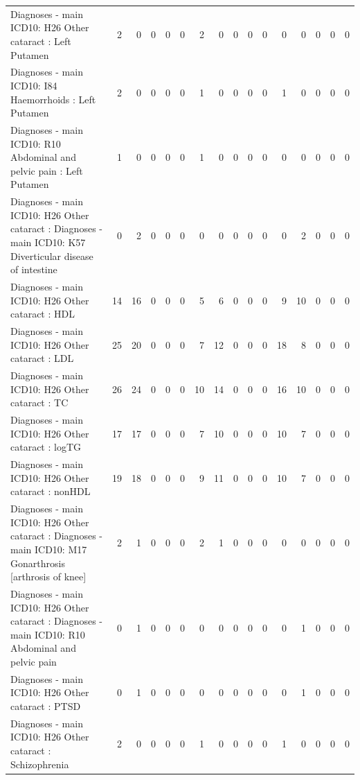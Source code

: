 \begin{table}[ht]
\begin{tabular}{lrrrrrrrrrrrrrrr}
  Diagnoses - main ICD10: H26 Other cataract : Left Putamen &   2 &   0 &   0 &   0 &   0 &   2 &   0 &   0 &   0 &   0 &   0 &   0 &   0 &   0 &   0 \\ 
  Diagnoses - main ICD10: I84 Haemorrhoids : Left Putamen &   2 &   0 &   0 &   0 &   0 &   1 &   0 &   0 &   0 &   0 &   1 &   0 &   0 &   0 &   0 \\ 
  Diagnoses - main ICD10: R10 Abdominal and pelvic pain : Left Putamen &   1 &   0 &   0 &   0 &   0 &   1 &   0 &   0 &   0 &   0 &   0 &   0 &   0 &   0 &   0 \\ 
  Diagnoses - main ICD10: H26 Other cataract : Diagnoses - main ICD10: K57 Diverticular disease of intestine &   0 &   2 &   0 &   0 &   0 &   0 &   0 &   0 &   0 &   0 &   0 &   2 &   0 &   0 &   0 \\ 
  Diagnoses - main ICD10: H26 Other cataract : HDL &  14 &  16 &   0 &   0 &   0 &   5 &   6 &   0 &   0 &   0 &   9 &  10 &   0 &   0 &   0 \\ 
  Diagnoses - main ICD10: H26 Other cataract : LDL &  25 &  20 &   0 &   0 &   0 &   7 &  12 &   0 &   0 &   0 &  18 &   8 &   0 &   0 &   0 \\ 
  Diagnoses - main ICD10: H26 Other cataract : TC &  26 &  24 &   0 &   0 &   0 &  10 &  14 &   0 &   0 &   0 &  16 &  10 &   0 &   0 &   0 \\ 
  Diagnoses - main ICD10: H26 Other cataract : logTG &  17 &  17 &   0 &   0 &   0 &   7 &  10 &   0 &   0 &   0 &  10 &   7 &   0 &   0 &   0 \\ 
  Diagnoses - main ICD10: H26 Other cataract : nonHDL &  19 &  18 &   0 &   0 &   0 &   9 &  11 &   0 &   0 &   0 &  10 &   7 &   0 &   0 &   0 \\ 
  Diagnoses - main ICD10: H26 Other cataract : Diagnoses - main ICD10: M17 Gonarthrosis [arthrosis of knee] &   2 &   1 &   0 &   0 &   0 &   2 &   1 &   0 &   0 &   0 &   0 &   0 &   0 &   0 &   0 \\ 
  Diagnoses - main ICD10: H26 Other cataract : Diagnoses - main ICD10: R10 Abdominal and pelvic pain &   0 &   1 &   0 &   0 &   0 &   0 &   0 &   0 &   0 &   0 &   0 &   1 &   0 &   0 &   0 \\ 
  Diagnoses - main ICD10: H26 Other cataract : PTSD &   0 &   1 &   0 &   0 &   0 &   0 &   0 &   0 &   0 &   0 &   0 &   1 &   0 &   0 &   0 \\ 
  Diagnoses - main ICD10: H26 Other cataract : Schizophrenia &   2 &   0 &   0 &   0 &   0 &   1 &   0 &   0 &   0 &   0 &   1 &   0 &   0 &   0 &   0 \\ 

\end{tabular}
\end{table}
